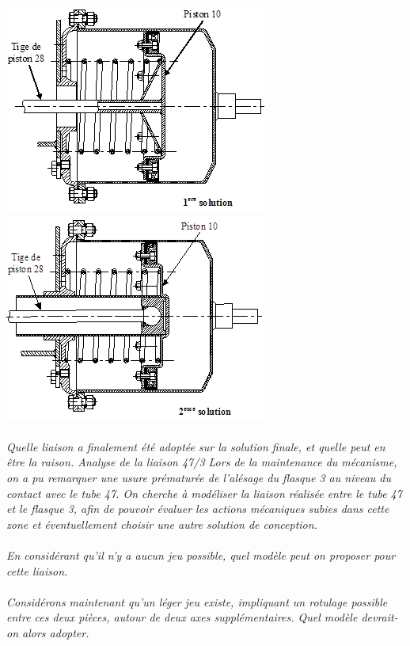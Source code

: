 \documentclass[11pt,oneside]{article}
\begin{document}
      \begin{center}
\includegraphics[width=.45\textwidth]{png/img5}
\includegraphics[width=.45\textwidth]{png/img6}
\end{center}

\paragraph{}
\textit{Quelle liaison a finalement été adoptée sur la solution finale, et quelle peut en être la raison.
Analyse de la liaison 47/3
Lors de la maintenance du mécanisme, on a pu remarquer une usure prématurée de l'alésage du flasque 3 au niveau du contact avec le tube 47.
On cherche à modéliser la liaison réalisée entre le tube 47 et le flasque 3, afin de pouvoir évaluer les actions mécaniques subies dans cette zone et éventuellement choisir une autre solution de conception.}

\paragraph{}
\textit{En considérant qu'il n'y a aucun jeu possible,  quel modèle peut on proposer pour cette liaison.}

\paragraph{}
\textit{Considérons maintenant qu'un léger jeu existe, impliquant un rotulage possible entre ces deux pièces, autour de deux axes supplémentaires. Quel modèle devrait-on alors adopter.}
\end{document}
